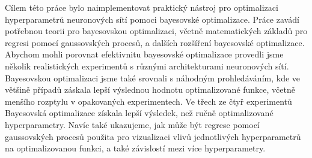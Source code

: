 \documentclass{article}
\begin{document}
Cílem této práce bylo naimplementovat praktický nástroj pro optimalizaci
hyperparametrů neuronových sítí pomoci bayesovské optimalizace. Práce zavádí
potřebnou teorii pro bayesovskou optimalizaci, včetně matematických základů
pro regresi pomocí gaussovských procesů, a dalších rozšíření bayesovské
optimalizace. Abychom mohli porovnat efektivnitu bayesovské optimalizace
provedli jsme několik realistických experimentů s různými architekturami
neuronových sítí. Bayesovskou optimalizaci jsme také srovnali s náhodným
prohledáváním, kde ve většině případů záskala lepší výslednou hodnotu
optimalizované funkce, včetně menšího rozptylu v opakovaných experimentech.
Ve třech ze čtyř experimentů Bayesovská optimalizace získala lepší výsledek,
než ručně optimalizované hyperparametry. Navíc také ukazujeme, jak může být
regrese pomocí gaussovských procesů použita pro vizualizaci vlivů
jednotlivých hyperparametrů na optimalizovanou funkci, a také závislostí
mezi více hyperparametry.
\end{document}

